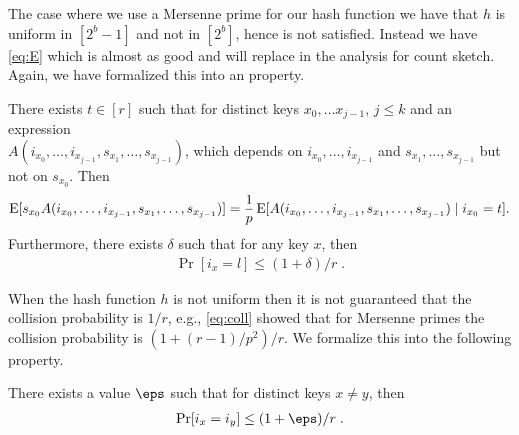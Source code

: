 The case where we use a Mersenne prime for our hash function we
have that $h$ is uniform in $[2^b - 1]$ and not in $[2^b]$, hence 
is not satisfied. Instead we have \cref{eq:E} which is almost as good
and will replace  in the analysis for count sketch.
Again, we have formalized this into an property.
\begin{property}\label{prop:near-independence}
    There exists $t \in [r]$ such that for distinct keys $x_0, \ldots x_{j - 1}$, $j \le k$
    and an expression \\$A(i_{x_0}, \ldots, i_{x_{j - 1}}, s_{x_1}, \ldots, s_{x_{j - 1}})$,
    which depends on $i_{x_0}, \ldots, i_{x_{j - 1}}$ and $s_{x_1}, \ldots, s_{x_{j - 1}}$
    but not on $s_{x_0}$. Then
    \begin{align}\label{eq:near-independence}
        \operatorname*{E}[s_{x_0} A(i_{x_0}, \ldots, i_{x_{j - 1}}, s_{x_1}, \ldots, s_{x_{j - 1}})]
            = \frac1p \operatorname*{E}[A(i_{x_0}, \ldots, i_{x_{j - 1}}, s_{x_1}, \ldots, s_{x_{j - 1}}) \mid i_{x_0} = t].
    \end{align}
    Furthermore, there exists $\delta$ such that for any key $x$, then
    \begin{align}\label{eq:prob-special-value}
        \Pr[i_x = l] \le (1 + \delta)/r \; .
    \end{align}
\end{property}

When the hash function $h$ is not uniform then it is not guaranteed that
the collision probability is $1/r$, e.g., \eqref{eq:coll} showed that for
Mersenne primes the collision probability is $(1 + (r - 1)/p^2)/r$. We
formalize this into the following property.
\begin{property}\label{prop:collision}
    There exists a value $\eps$ such that for distinct keys $x \neq y$,
    then
    \begin{align}\label{eq:collision}
        \Pr[i_x = i_y] \le (1 + \eps)/r\; .
    \end{align}
\end{property}

